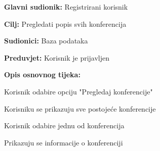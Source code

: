 				\noindent {}
				\begin{packed_item}
					
					\item \textbf{Glavni sudionik: }Registrirani korisnik
					\item  \textbf{Cilj:} Pregledati popis svih konferencija
					\item  \textbf{Sudionici:} Baza podataka
					\item  \textbf{Preduvjet:} Korisnik je prijavljen
					\item  \textbf{Opis osnovnog tijeka:}
					
					\item[] \begin{packed_enum}
						
						\item Korisnik odabire opciju "Pregledaj konferencije"
						\item Korisniku se prikazuju sve postojeće konferencije
						\item Korisnik odabire jednu od konferencija
						\item Prikazuju se informacije o konferenciji
						
					\end{packed_enum}
				\end{packed_item}
			
